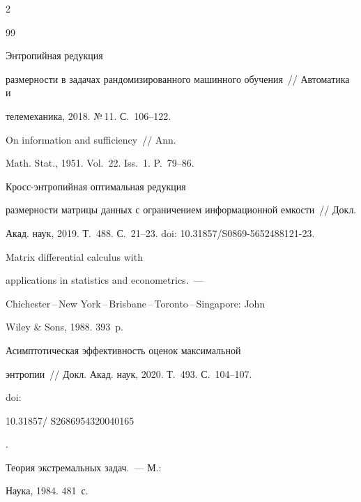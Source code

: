 \begin{multicols}{2}
{{\begin{thebibliography}{99}


 Энтропийная редукция 


размерности в задачах рандомизированного машинного обучения~// Автоматика и 


телемеханика, 2018. №\,11. С.~106--122.







 On information and sufficiency~// Ann. 


Math. Stat., 1951. Vol.~22. Iss.~1. P.~79--86.







 Кросс-энтропийная оптимальная редукция 


размерности матрицы данных с ограничением информационной емкости~// Докл. 


Акад. наук, 2019. Т.~488. С.~21--23. doi: 10.31857/S0869-5652488121-23.







 Matrix differential calculus with 


applications in statistics and econometrics.~--- 


Chichester\,--\,New York\,--\,Brisbane\,--\,Toronto\,--\,Singapore: John 


Wiley \& Sons, 1988. 393~p.







 Асимптотическая эффективность оценок максимальной 


энтропии~// Докл. Акад. наук, 2020. Т.~493. С.~104--107. {doi: 


10.31857/ S2686954320040165}.







 Теория экстремальных задач.~--- М.: 


Наука, 1984. 481~с.






\end{thebibliography}}}
\end{multicols}
